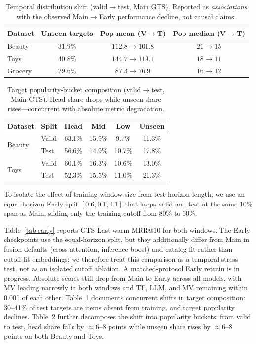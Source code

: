 \documentclass[sigconf,natbib=true,anonymous]{acmart}
\begin{document}
\begin{table}[t]
\centering
\caption{%
Temporal distribution shift (valid$\to$test, Main GTS).
Reported as \emph{associations} with the observed Main$\to$Early performance decline, not causal claims.%
}
\label{tab:shift}
\small
\setlength{\tabcolsep}{4pt}
\begin{tabular}{@{}lccc@{}}
\toprule
Dataset & Unseen targets & Pop mean (V$\to$T) & Pop median (V$\to$T) \\
\midrule
Beauty  & 31.9\% & $112.8 \to 101.8$ & $21 \to 15$ \\
Toys    & 40.8\% & $144.7 \to 119.1$ & $18 \to 11$ \\
Grocery & 29.6\% & $87.3 \to 76.9$ & $16 \to 12$ \\
\bottomrule
\end{tabular}
\end{table}

\begin{table}[t]
\centering
\caption{%
Target popularity-bucket composition (valid$\to$test, Main GTS).
Head share drops while unseen share rises---concurrent with absolute metric degradation.%
}
\label{tab:bucket}
\small
\setlength{\tabcolsep}{3.5pt}
\begin{tabular}{@{}llcccc@{}}
\toprule
Dataset & Split & Head & Mid & Low & Unseen \\
\midrule
\multirow{2}{*}{Beauty}
 & Valid & 63.1\% & 15.9\% & 9.7\% & 11.3\% \\
 & Test  & 56.6\% & 14.9\% & 10.7\% & 17.8\% \\
\midrule
\multirow{2}{*}{Toys}
 & Valid & 60.1\% & 16.3\% & 10.6\% & 13.0\% \\
 & Test  & 52.3\% & 15.5\% & 11.0\% & 21.3\% \\
\bottomrule
\end{tabular}
\end{table}

To isolate the effect of training-window size from test-horizon length, we use an equal-horizon Early split $[0.6, 0.1, 0.1]$ that keeps valid and test at the same 10\% span as Main, sliding only the training cutoff from 80\% to 60\%.

Table~\ref{tab:early} reports GTS-Last warm MRR@10 for both windows.
The Early checkpoints use the equal-horizon split, but they additionally differ from Main in fusion defaults (cross-attention, inference boost) and catalog-fit rather than cutoff-fit embeddings; we therefore treat this comparison as a temporal stress test, not as an isolated cutoff ablation.
A matched-protocol Early retrain is in progress.
Absolute scores still drop from Main to Early across all models, with MV leading narrowly in both windows and TF, LLM, and MV remaining within 0.001 of each other.
Table~\ref{tab:shift} documents concurrent shifts in target composition: 30--41\% of test targets are items absent from training, and target popularity declines.
Table~\ref{tab:bucket} further decomposes the shift into popularity buckets: from valid to test, head share falls by $\approx$6--8 points while unseen share rises by $\approx$6--8 points on both Beauty and Toys.
\end{document}
